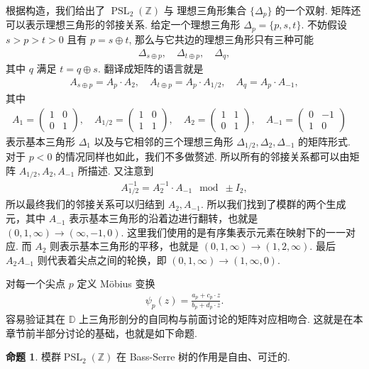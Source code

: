 \documentclass[10pt,UTF8]{ctexart}
\newcommand{\Z}{\mathbb{Z}}
\newcommand{\D}{\mathbb{D}}
\newcommand{\PSL}{\operatorname{PSL}_2(\Z)}
\theoremstyle{definition}
\newtheorem{proposition}[theorem]{命题}
\theoremstyle{remark}
\begin{document}
根据构造，我们给出了 $\PSL$ 与 理想三角形集合 $\{\Delta_p\}$ 的一个双射. 矩阵还可以表示理想三角形的邻接关系. 
给定一个理想三角形 $\Delta_p =\{p,s,t\}$. 不妨假设 $s>p>t>0$ 且有 $p=s\oplus t$, 那么与它共边的理想三角形只有三种可能
\begin{align*}
    \Delta_{s\oplus p},\quad \Delta_{t\oplus p},\quad \Delta_q,
\end{align*}
其中 $q$ 满足 $t=q\oplus s$. 翻译成矩阵的语言就是 
\begin{align*}
    A_{s\oplus p} =  A_p\cdot A_2, \quad  A_{t\oplus p} = A_p\cdot A_{1/2},\quad A_q = A_p\cdot A_{-1},
\end{align*}
其中 
\begin{align*}
    A_1 = \begin{pmatrix} 1 & 0 \\ 0 & 1 \end{pmatrix},\quad 
    A_{1/2} = \begin{pmatrix} 1 & 0 \\ 1 & 1 \end{pmatrix},\quad
    A_{2} = \begin{pmatrix} 1 & 1 \\ 0 & 1 \end{pmatrix},\quad
    A_{-1} = \begin{pmatrix} 0 & -1 \\ 1 & 0 \end{pmatrix}\quad
\end{align*}
表示基本三角形 $\Delta_1$ 以及与它相邻的三个理想三角形 $\Delta_{1/2},\Delta_{2},\Delta_{-1}$ 的矩阵形式. 对于 $p<0$ 的情况同样也如此，我们不多做赘述.
所以所有的邻接关系都可以由矩阵 $A_{1/2},A_{2},A_{-1}$ 所描述.
又注意到 
\begin{align*}
    A^{-1}_{1/2} = A^{-1}_2\cdot A_{-1} \mod \pm I_2, 
\end{align*}
所以最终我们的邻接关系可以归结到 $A_2,A_{-1}$. 所以我们找到了模群的两个生成元，其中 $A_{-1}$ 表示基本三角形的沿着边进行翻转，也就是 $(0,1,\infty)\to (\infty,-1,0)$. 这里我们使用的是有序集表示元素在映射下的一一对应. 
而 $A_2$ 则表示基本三角形的平移，也就是 $(0,1,\infty)\to (1,2,\infty)$. 最后 $A_2A_{-1}$ 则代表着尖点之间的轮换，即 $(0,1,\infty)\to (1,\infty,0)$. 

对每一个尖点 $p$ 定义 Möbius 变换 
\begin{align*}
    \psi_p(z) = \frac{a_p+c_p \cdot z}{b_p+d_p\cdot z}.
\end{align*}
容易验证其在 $\D$ 上三角形剖分的自同构与前面讨论的矩阵对应相吻合. 这就是在本章节前半部分讨论的基础，也就是如下命题. 
\begin{proposition}
    模群$\PSL$ 在 Bass-Serre 树的作用是自由、可迁的.
\end{proposition}
\end{document}
